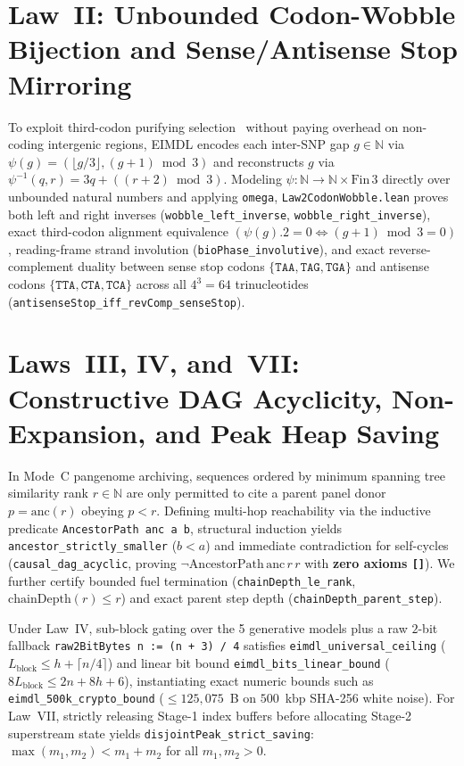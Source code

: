 \documentclass[10pt]{article}
\begin{document}
\section{Law~II: Unbounded Codon-Wobble Bijection and Sense/Antisense Stop Mirroring}

To exploit third-codon purifying selection~\cite{crick1966codon} without paying overhead on non-coding intergenic regions, EIMDL encodes each inter-SNP gap $g \in \mathbb{N}$ via $\psi(g) = (\lfloor g/3 \rfloor, (g+1)\bmod 3)$ and reconstructs $g$ via $\psi^{-1}(q, r) = 3q + ((r+2)\bmod 3)$. Modeling $\psi : \mathbb{N} \to \mathbb{N} \times \mathrm{Fin}\,3$ directly over unbounded natural numbers and applying \texttt{omega}, \texttt{Law2CodonWobble.lean} proves both left and right inverses (\texttt{wobble\_left\_inverse}, \texttt{wobble\_right\_inverse}), exact third-codon alignment equivalence $(\psi(g).2 = 0 \iff (g+1) \bmod 3 = 0)$, reading-frame strand involution (\texttt{bioPhase\_involutive}), and exact reverse-complement duality between sense stop codons $\{\texttt{TAA},\texttt{TAG},\texttt{TGA}\}$ and antisense codons $\{\texttt{TTA},\texttt{CTA},\texttt{TCA}\}$ across all $4^3 = 64$ trinucleotides (\texttt{antisenseStop\_iff\_revComp\_senseStop}).

\section{Laws~III, IV, and~VII: Constructive DAG Acyclicity, Non-Expansion, and Peak Heap Saving}

In Mode~C pangenome archiving, sequences ordered by minimum spanning tree similarity rank $r \in \mathbb{N}$ are only permitted to cite a parent panel donor $p = \mathrm{anc}(r)$ obeying $p < r$. Defining multi-hop reachability via the inductive predicate \texttt{AncestorPath anc a b}, structural induction yields \texttt{ancestor\_strictly\_smaller} ($b < a$) and immediate contradiction for self-cycles (\texttt{causal\_dag\_acyclic}, proving $\neg \mathrm{AncestorPath\,anc}\,r\,r$ with \textbf{zero axioms \texttt{[]}}). We further certify bounded fuel termination (\texttt{chainDepth\_le\_rank}, $\mathrm{chainDepth}(r) \le r$) and exact parent step depth (\texttt{chainDepth\_parent\_step}).

Under Law~IV, sub-block gating over the 5 generative models plus a raw $2$-bit fallback \texttt{raw2BitBytes n := (n + 3) / 4} satisfies \texttt{eimdl\_universal\_ceiling} ($L_{\text{block}} \le h + \lceil n/4 \rceil$) and linear bit bound \texttt{eimdl\_bits\_linear\_bound} ($8 L_{\text{block}} \le 2n + 8h + 6$), instantiating exact numeric bounds such as \texttt{eimdl\_500k\_crypto\_bound} ($\le 125,075$~B on $500$~kbp SHA-256 white noise). For Law~VII, strictly releasing Stage-1 index buffers before allocating Stage-2 superstream state yields \texttt{disjointPeak\_strict\_saving}: $\max(m_1, m_2) < m_1 + m_2$ for all $m_1, m_2 > 0$.
\end{document}
